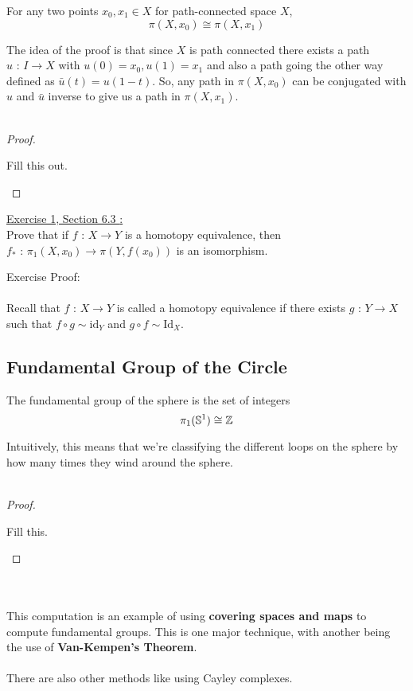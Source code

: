 \documentclass[11pt]{article}
\begin{document}
\begin{bluebox}
  \begin{theorem}
    For any two points $x_0, x_1 \in X$ for path-connected space $X$, $$ \pi(X, x_0) \cong \pi(X, x_1) $$
  \end{theorem}
\end{bluebox} The idea of the proof is that since $X$ is path connected there exists a path $u \text{ : } I \rightarrow X$ with $u(0) = x_0, u(1) = x_1$ and also a path going the other way defined as $\bar{u}(t) = u(1-t)$. So, any path in $\pi(X, x_0)$ can be conjugated with $u$ and $\bar{u}$ inverse to give us a path in $\pi(X, x_1)$.
\\
\\
\begin{proof}
  \begin{note}
    {Fill this out.}
  \end{note}
\end{proof}

\begin{dottedbox}
  \underline{Exercise 1, Section 6.3 \cite{FomenkoFuchs16}:} \\
  Prove that if $f \text{ : } X \rightarrow Y$ is a homotopy equivalence, then $f_* \text{ : } \pi_1(X, x_0) \rightarrow \pi(Y, f(x_0))$ is an isomorphism.
\end{dottedbox}

\begin{dottedbox}
  Exercise Proof:
  \\
  \\
  Recall that $f \text{ : } X \rightarrow Y$ is called a homotopy equivalence if there exists $g \text{ : } Y \rightarrow X$ such that $f \circ g \sim \mathrm{id}_Y$ and $g \circ f \sim \mathrm{Id}_X$. 
\end{dottedbox}

\subsection{Fundamental Group of the Circle}

\begin{bluebox}
  \begin{theorem}
    The fundamental group of the sphere is the set of integers $$ \pi_1(\mathbb{S}^1) \cong \mathbb{Z} $$
  \end{theorem}  
\end{bluebox} Intuitively, this means that we're classifying the different loops on the sphere by how many times they wind around the sphere.
\\
\\
\begin{proof}
  \begin{note}
    {Fill this.}
  \end{note}
\end{proof} 
\\
\\
This computation is an example of using \textbf{covering spaces and maps} to compute fundamental groups. This is one major technique, with another being the use of \textbf{Van-Kempen's Theorem}.
\\
\\
There are also other methods like using Cayley complexes.
\end{document}
